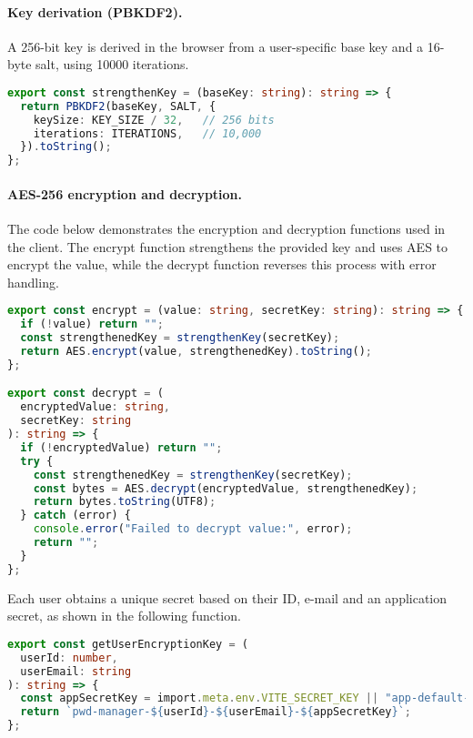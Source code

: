 \paragraph{Key derivation (PBKDF2).}
A 256-bit key is derived in the browser from a user-specific base key and a 16-byte salt, using 10000 iterations.

\begin{lstlisting}[language=TypeScript, caption={Key derivation function using PBKDF2}, label={lst:strengthen-key}]
export const strengthenKey = (baseKey: string): string => {
  return PBKDF2(baseKey, SALT, {
    keySize: KEY_SIZE / 32,   // 256 bits
    iterations: ITERATIONS,   // 10,000
  }).toString();
};
\end{lstlisting}

\paragraph{AES-256 encryption and decryption.}
The code below demonstrates the encryption and decryption functions used in the client. The encrypt function strengthens the provided key and uses AES to encrypt the value, while the decrypt function reverses this process with error handling.

\begin{lstlisting}[language=TypeScript, caption={AES-256 encryption and decryption functions}, label={lst:encrypt-decrypt}]
export const encrypt = (value: string, secretKey: string): string => {
  if (!value) return "";
  const strengthenedKey = strengthenKey(secretKey);
  return AES.encrypt(value, strengthenedKey).toString();
};

export const decrypt = (
  encryptedValue: string,
  secretKey: string
): string => {
  if (!encryptedValue) return "";
  try {
    const strengthenedKey = strengthenKey(secretKey);
    const bytes = AES.decrypt(encryptedValue, strengthenedKey);
    return bytes.toString(UTF8);
  } catch (error) {
    console.error("Failed to decrypt value:", error);
    return "";
  }
};
\end{lstlisting}

Each user obtains a unique secret based on their ID, e-mail and an application secret, as shown in the following function.

\begin{lstlisting}[language=TypeScript, caption={User-specific encryption key generation}, label={lst:user-key}]
export const getUserEncryptionKey = (
  userId: number,
  userEmail: string
): string => {
  const appSecretKey = import.meta.env.VITE_SECRET_KEY || "app-default-key";
  return `pwd-manager-${userId}-${userEmail}-${appSecretKey}`;
};
\end{lstlisting}

